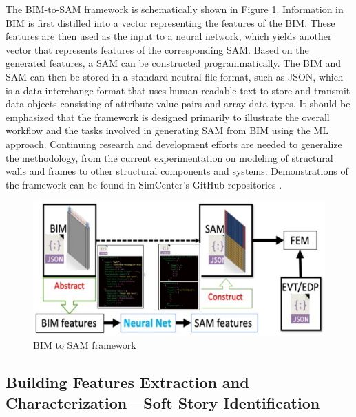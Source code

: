 The BIM-to-SAM framework is schematically shown in Figure \ref{fig:BIM_to_SAM}. Information in BIM is first distilled into a vector representing the features of the BIM. These features are then used as the input to a neural network, which yields another vector that represents features of the corresponding SAM. Based on the generated features, a SAM can be constructed programmatically. The BIM and SAM can then be stored in a standard neutral file format, such as JSON, which is a data-interchange format that uses human-readable text to store and transmit data objects consisting of attribute-value pairs and array data types. It should be emphasized that the framework is designed primarily to illustrate the overall workflow and the tasks involved in generating SAM from BIM using the ML approach. Continuing research and development efforts are needed to generalize the methodology, from the current experimentation on modeling of structural walls and frames to other structural components and systems. Demonstrations of the framework can be found in SimCenter's GitHub repositories \citep{wang2019bim2sam, wang2019swim}.

\begin{figure}[htb]
    \centering
    \includegraphics[width=1.0\textwidth, angle = 0]{Figures/BIM_to_SAM.png}
    \caption{BIM to SAM framework}
    \label{fig:BIM_to_SAM}
\end{figure}

\subsection{Building Features Extraction and Characterization—Soft Story Identification}

